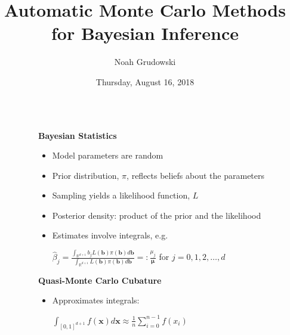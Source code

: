\documentclass[final,mathserif]{beamer}
\title{Automatic Monte Carlo Methods for Bayesian Inference}
\author{Noah Grudowski}
\institute{Applied Mathematics, Illinois Institute of
Technology}
\date{Thursday, August 16, 2018}
\newcommand{\blue}[1]{{\color{myblue}#1}}
\renewcommand{\blue}{\textcolor{blue!80!black}}
\begin{document}
\vspace*{-1.5ex}
\begin{frame}[fragile]

\begin{columns}[t]

\begin{column}{.02\linewidth}\end{column} %

\begin{column}{.31\linewidth} %

\begin{block}{\Large \textbf{\blue {Bayesian Statistics}}}
\vspace{.1in}
\begin{itemize}
\item Model parameters are random
\item \alert{Prior} distribution, $\pi$, reflects beliefs about the parameters
\item Sampling yields a likelihood function, $L$
\item \alert{Posterior} density: product of the prior and the likelihood
\item Estimates involve integrals, e.g. 

\vspace{.15in}

$\hat{\beta}_j=\frac{\int_{\mathbb{R}^{d+1}}b_jL(\boldsymbol{b})\pi(\boldsymbol{b})d\boldsymbol{b}}{\int_{\mathbb{R}^{d+1}}L(\boldsymbol{b})\pi(\boldsymbol{b})d\boldsymbol{b}} =: \frac{\mu_j}{\boldsymbol{\mu}}$  for  $j=0, 1, 2,\ldots, d$

\vspace{.1in}

\end{itemize}
\end{block}

\vspace{.1in}

\begin{block} {\Large \textbf{\blue {Quasi-Monte Carlo Cubature}}}
\vspace{.1in}
\begin{itemize}
\item Approximates integrals:

\vspace{0.15in}

$\int_{[0, 1]^{d+1}}f(\boldsymbol{x})d\boldsymbol{x}\approx \frac{1}{n} \sum_{i=0}^{n-1}f({x_i})$ 

\vspace{.15in}


\end{itemize}
\end{block}
\end{column}
\end{columns}
\end{frame}
\end{document}
